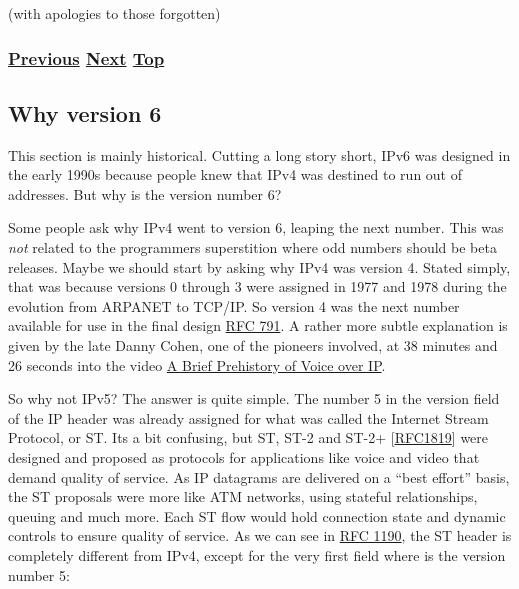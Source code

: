 \documentclass[
]{article}
\begin{document}
(with apologies to those forgotten)

\subsubsection{\texorpdfstring{\hyperref[how-to-contribute]{Previous}
\hyperref[why-version-6]{Next}
\hyperref[introduction-and-foreword]{Top}}{Previous Next Top}}\label{previous-next-top-6}

\pagebreak

\subsection{Why version 6}\label{why-version-6}

This section is mainly historical. Cutting a long story short, IPv6 was
designed in the early 1990s because people knew that IPv4 was destined
to run out of addresses. But why is the version number 6?

Some people ask why IPv4 went to version 6, leaping the next number.
This was \emph{not} related to the programmer\textquotesingle s
superstition where odd numbers should be beta releases. Maybe we should
start by asking why IPv4 was version 4. Stated simply, that was because
versions 0 through 3 were assigned in 1977 and 1978 during the evolution
from ARPANET to TCP/IP. So version 4 was the next number available for
use in the final design
\href{https://www.rfc-editor.org/info/rfc791}{RFC 791}. A rather more
subtle explanation is given by the late Danny Cohen, one of the pioneers
involved, at 38 minutes and 26 seconds into the video
\href{https://youtu.be/av4KF1j-wp4}{A Brief Prehistory of Voice over
IP}.

So why not IPv5? The answer is quite simple. The number 5 in the version
field of the IP header was already assigned for what was called the
Internet Stream Protocol, or ST. It\textquotesingle s a bit confusing,
but ST, ST-2 and ST-2+
{[}\href{https://www.rfc-editor.org/info/rfc1819}{RFC1819}{]} were
designed and proposed as protocols for applications like voice and video
that demand quality of service. As IP datagrams are delivered on a
``best effort'' basis, the ST proposals were more like ATM networks,
using stateful relationships, queuing and much more. Each ST flow would
hold connection state and dynamic controls to ensure quality of service.
As we can see in \href{https://www.rfc-editor.org/info/rfc1190}{RFC
1190}, the ST header is completely different from IPv4, except for the
very first field where is the version number 5:
\end{document}
